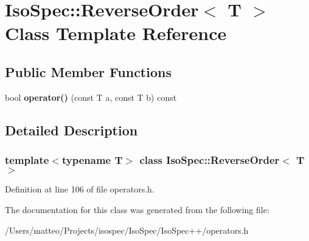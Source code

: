 \hypertarget{class_iso_spec_1_1_reverse_order}{}\section{Iso\+Spec\+:\+:Reverse\+Order$<$ T $>$ Class Template Reference}
\label{class_iso_spec_1_1_reverse_order}
\subsection*{Public Member Functions}
\begin{DoxyCompactItemize}
\item 
\mbox{\label{class_iso_spec_1_1_reverse_order_a350cba89162d701a0f0f4cf1e4424e44}} 
bool {\bfseries operator()} (const T a, const T b) const
\end{DoxyCompactItemize}


\subsection{Detailed Description}
\subsubsection*{template$<$typename T$>$\newline
class Iso\+Spec\+::\+Reverse\+Order$<$ T $>$}



Definition at line 106 of file operators.\+h.



The documentation for this class was generated from the following file\+:\begin{DoxyCompactItemize}
\item 
/\+Users/matteo/\+Projects/isospec/\+Iso\+Spec/\+Iso\+Spec++/operators.\+h\end{DoxyCompactItemize}
